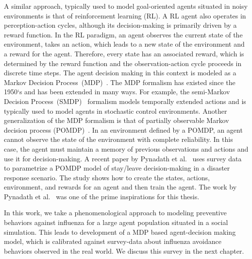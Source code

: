 \documentclass[doublespace]{VTthesis}
\begin{document}
    A similar approach, typically used to model goal-oriented agents situated in noisy environments is that of reinforcement learning (RL). A RL agent also operates in perception-action cycles, although its decision-making is primarily driven by a reward function. In the RL paradigm, an agent observes the current state of the environment, takes an action, which leads to a new state of the environment and a reward for the agent. Therefore, every state has an associated reward, which is determined by the reward function and the observation-action cycle proceeds in discrete time steps. The agent decision making in this context is modeled as a Markov Decision Process~(MDP)~\cite{white1989markov}. The MDP formalism has existed since the 1950`s and has been extended in many ways. For example, the semi-Markov Decision Process~(SMDP)~\cite{baykal2010semi} formalism models temporally extended actions and is typically used to model agents in stochastic control environments. Another generalization of the MDP formalism is that of partially observable Markov decision process (POMDP)~\cite{kaelbling1998planning}. In an environment defined by a POMDP, an agent cannot observe the state of the environment with complete reliability. In this case, the agent must maintain a memory of previous observations and actions and use it for decision-making. A recent paper by Pynadath et al.~\cite{pynadath16behavior} uses survey data to parametrize a POMDP model of stay/leave decision-making in a disaster response scenario. The study shows how to create the states, actions, environment, and rewards for an agent and then train the agent. The work by Pynadath et al.~\cite{pynadath16behavior} was one of the prime inspirations for this thesis.
    
    In this work, we take a phenomenological approach to modeling preventive behaviors against influenza for a large agent population situated in a social simulation. This leads to development of a MDP based agent-decision making model, which is calibrated against survey-data about influenza avoidance behaviors observed in the real world. We discuss this survey in the next chapter.
    
\end{document}
